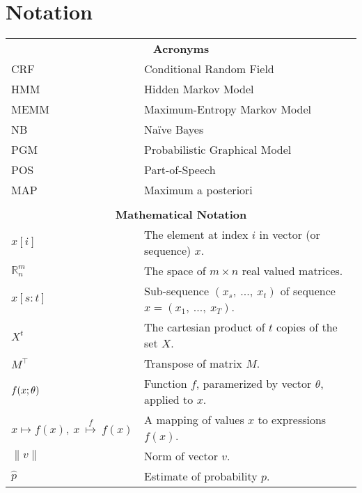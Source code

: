 \documentclass[officiallayout,final]{unihelcompling}
\newcommand{\R}{\mbox{$\mathbb R$}}
\newcommand{\parcond}{\mbox{$ ; \, $}}
\renewcommand{\:}{\mbox{${\rm :}$}}
\begin{document}
\chapter*{Notation}
\markboth{}{}
\begin{tabular*}{\columnwidth}{@{\extracolsep{\stretch{1}}}*{2}{l}@{}}
\multicolumn{2}{c}{{\bf Acronyms}}\\
CRF  & Conditional Random Field                          \\
HMM  & Hidden Markov Model                               \\
MEMM & Maximum-Entropy Markov Model                      \\
NB   & Na\"{i}ve Bayes                                   \\
PGM  & Probabilistic Graphical Model                     \\
POS  & Part-of-Speech                                    \\
MAP  & Maximum a posteriori                              \\
     & \\
\multicolumn{2}{c}{{\bf Mathematical Notation}}\\
$x[i]$ & The element at index $i$ in vector (or sequence) $x$.\\
$\R^m_n$ & The space of $m \times n$ real valued matrices.\\
$x[s:t]$ & Sub-sequence $(x_s,\ ...,\ x_t)$ of sequence $x = (x_1,\ ...,\ x_T)$.\\
$X^t$    & The cartesian product of $t$ copies of the set $X$.\\
$M^\top$ & Transpose of matrix $M$.\\
$f(x\parcond\theta)$ & Function $f$, paramerized by vector $\theta$, applied to $x$.\\
$x \mapsto f(x),\ x \overset{f}{\ \mapsto\ } f(x)$ & A mapping of values $x$ to expressions $f(x)$.\\
$\|v\|$ & Norm of vector $v$.\\
$\hat{p}$ & Estimate of probability $p$.
\end{tabular*}













%
\end{document}
